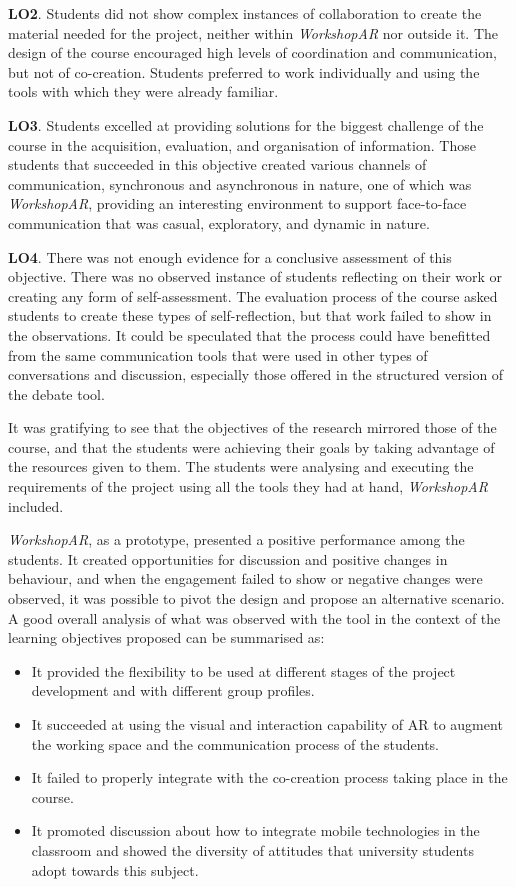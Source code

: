 \textbf{LO2}. Students did not show complex instances of collaboration to create the material needed for the project, neither within \emph{WorkshopAR} nor outside it. The design
of the course encouraged high levels of coordination and communication, but not of co-creation. Students preferred to work individually and using the tools with which they
were already familiar.

\textbf{LO3}. Students excelled at providing solutions for the biggest challenge of the course in the acquisition, evaluation, and organisation of information. Those
students that succeeded in this objective created various channels of communication, synchronous and asynchronous in nature, one of which was \emph{WorkshopAR}, providing an
interesting environment to support face-to-face communication that was casual, exploratory, and dynamic in nature.

\textbf{LO4}. There was not enough evidence for a conclusive assessment of this objective. There was no observed instance of students reflecting on their work or creating
any form of self-assessment. The evaluation process of the course asked students to create these types of self-reflection, but that work failed to show in the observations.
It could be speculated that the process could have benefitted from the same communication tools that were used in other types of conversations and discussion, especially
those offered in the structured version of the debate tool.

It was gratifying to see that the objectives of the research mirrored those of the course, and that the students were achieving their goals by taking advantage of the
resources given to them. The students were analysing and executing the requirements of the project using all the tools they had at hand, \emph{WorkshopAR} included.

\emph{WorkshopAR}, as a prototype, presented a positive performance among the students. It created opportunities for discussion and positive changes in behaviour, and
when the engagement failed to show or negative changes were observed, it was possible to pivot the design and propose an alternative scenario. A good overall analysis of
what was observed with the tool in the context of the learning objectives proposed can be summarised as:

\begin{itemize}
    \item It provided the flexibility to be used at different stages of the project development and with different group profiles.
    \item It succeeded at using the visual and interaction capability of \ac{AR} to augment the working space and the communication process of the students.
    \item It failed to properly integrate with the co-creation process taking place in the course.
    \item It promoted discussion about how to integrate mobile technologies in the classroom and showed the diversity of attitudes that university students adopt towards
    this subject.
\end{itemize}

